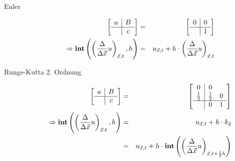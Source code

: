 \documentclass[11pt]{article} %
\theoremstyle{definition}
\begin{document}
\begin{description}
\item[Euler]
\begin{eqnarray*}
\begin{bmatrix}
\begin{array}{c|c}
a & B\\
\hline     & c \\
\end{array}
\end{bmatrix}
 &=& \begin{bmatrix}
\begin{array}{c|c}
0 & 0 \\\hline
& 1
\end{array}
\end{bmatrix} \\
\Rightarrow \mathbf{int}\left(\left(\frac{\Delta}{\Delta \vec x}u \right)_{\vec x, t}, h\right) &=& u_{\vec x, t} + h\cdot \left(\frac{\Delta}{\Delta \vec x}u \right)_{\vec x, t}
\end{eqnarray*}

\item[Runge-Kutta 2. Ordnung]
\begin{eqnarray*}
\begin{bmatrix}
\begin{array}{c|c}
a & B\\
\hline     & c \\
\end{array}
\end{bmatrix} &=& \begin{bmatrix}
\begin{array}{c|cc}
0 & 0 \\
\frac 1 2 & \frac 1 2 & 0 \\\hline
& 0 & 1
\end{array}
\end{bmatrix} \\
\Rightarrow \mathbf{int}\left(\left(\frac{\Delta}{\Delta \vec x}u \right)_{\vec x, t}, h\right) &=& u_{\vec x, t} + h\cdot k_2 \\
&=&  u_{\vec x, t} + h\cdot\mathbf{int}\left(\left(\frac{\Delta}{\Delta \vec x}u \right)_{\vec x, t + \frac 1 2 h} \right) \\
\end{eqnarray*}


\end{description}
\end{document}
